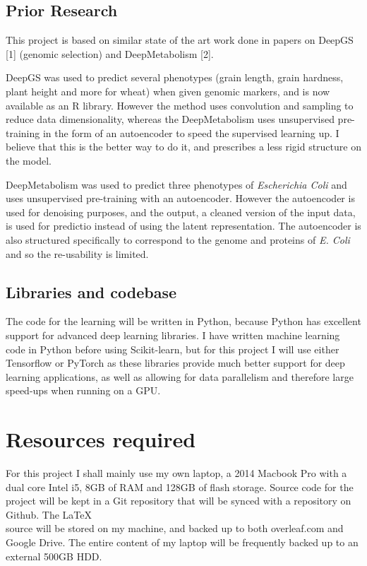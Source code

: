 \documentclass[12pt,a4paper,twoside,openany]{article}
\begin{document}
\subsection*{Prior Research}

This project is based on similar state of the art work done in papers on DeepGS [1] (genomic selection) and DeepMetabolism [2].

DeepGS was used to predict several phenotypes (grain length, grain hardness, plant height and more for wheat) when given genomic markers, and is now available as an R library. However the method  uses convolution and sampling to reduce data dimensionality, whereas the DeepMetabolism uses unsupervised pre-training in the form of an autoencoder to speed the supervised learning up. I believe that this is the better way to do it, and prescribes a less rigid structure on the model.

DeepMetabolism was used to predict three phenotypes of \textit{Escherichia Coli} and uses unsupervised pre-training with an autoencoder. However the autoencoder is used for denoising purposes, and the output, a cleaned version of the input data, is used for predictio instead of using the latent representation. The autoencoder is also structured specifically to correspond to the genome and proteins of \textit{E. Coli} and so the re-usability is limited.

\subsection*{Libraries and codebase}

The code for the learning will be written in Python, because Python has excellent support for advanced deep learning libraries. I have written machine learning code in Python before using Scikit-learn, but for this project I will use either Tensorflow or PyTorch as these libraries provide much better support for deep learning applications, as well as allowing for data parallelism and therefore large speed-ups when running on a GPU.

\section*{Resources required}

For this project I shall mainly use my own laptop, a 2014 Macbook Pro with a dual core Intel i5, 8GB of RAM and 128GB of flash storage. Source code for the project will be kept in a Git repository that will be synced with a repository on Github. The \LaTeX\\ source will be stored on my machine, and backed up to both overleaf.com and Google Drive. The entire content of my laptop will be frequently backed up to an external 500GB HDD.
\end{document}
